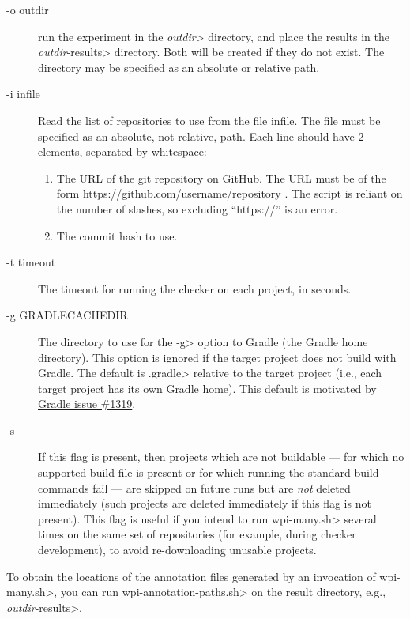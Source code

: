 \begin{description}
\item[-o outdir]
  run the experiment in the \<\emph{outdir}> directory, and place the results in
  the \<\emph{outdir}-results> directory. Both will be created if they do not
  exist.  The directory may be specified as an absolute or relative path.

\item[-i infile]
  Read the list of repositories to use from the file infile.
  The file must be specified as an absolute, not relative, path.
  Each line
  should have 2 elements, separated by whitespace:
  \begin{enumerate}
  \item
    The URL of the git repository on GitHub. The URL must be of the form
    https://github.com/username/repository .  The script is reliant on the
    number of slashes, so excluding ``https://'' is an error.
  \item The commit hash to use.
  \end{enumerate}

\item[-t timeout]
  The timeout for running the checker on each project, in seconds.

\item[-g GRADLECACHEDIR]
  The directory to use for the \<-g> option to Gradle (the Gradle home
  directory). This option is ignored if the target project does not
  build with Gradle. The default is \<.gradle> relative to the target
  project (i.e., each target project has its own Gradle home). This default
  is motivated by
  \href{https://github.com/gradle/gradle/issues/1319}{Gradle issue \#1319}.

\item[-s]
  If this flag is present, then projects which are not buildable --- for which
  no supported build file is present or for which running the standard build
  commands fail --- are skipped on future runs but are \emph{not} deleted immediately
  (such projects are deleted immediately if this flag is not present). This flag is useful
  if you intend to run \<wpi-many.sh> several times on the same set of repositories
  (for example, during checker development), to avoid re-downloading unusable projects.

\end{description}

To obtain the locations of the annotation files generated by an invocation of
\<wpi-many.sh>, you can run \<wpi-annotation-paths.sh> on the result directory,
e.g., \<\emph{outdir}-results>.

